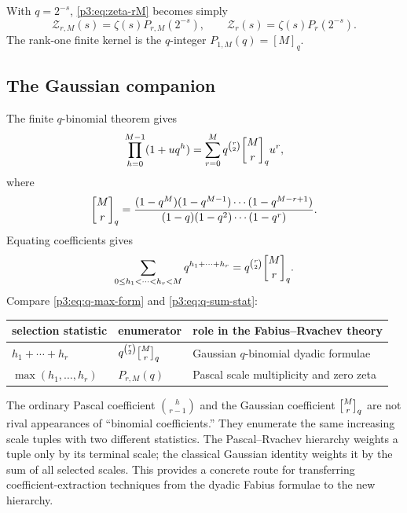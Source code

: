 \documentclass[11pt,oneside]{article}
\theoremstyle{definition}
\theoremstyle{remark}
\begin{document}
With $q=2^{-s}$, \eqref{p3:eq:zeta-rM} becomes simply
\begin{equation}\label{p3:eq:zeta-q-kernel}
  \mathcal Z_{r,M}(s)=\zeta(s)P_{r,M}(2^{-s}),
  \qquad
  \mathcal Z_r(s)=\zeta(s)P_r(2^{-s}).
\end{equation}
The rank-one finite kernel is the $q$-integer $P_{1,M}(q)=[M]_q$.

\subsection{The Gaussian companion}

The finite $q$-binomial theorem gives
\begin{equation}\label{p3:eq:q-binomial-theorem}
 \prod_{h=0}^{M-1}(1+u q^h)
 =\sum_{r=0}^{M}q^{\binom r2}\qbinomPartl{M}{r} u^r,
\end{equation}
where
\[
 \qbinomPartl{M}{r}
 =\frac{(1-q^M)(1-q^{M-1})\cdots(1-q^{M-r+1})}
 {(1-q)(1-q^2)\cdots(1-q^r)}.
\]
Equating coefficients gives
\begin{equation}\label{p3:eq:q-sum-stat}
 \sum_{0\le h_1<\cdots<h_r<M}q^{h_1+\cdots+h_r}
 =q^{\binom r2}\qbinomPartl{M}{r}.
\end{equation}
Compare \eqref{p3:eq:q-max-form} and \eqref{p3:eq:q-sum-stat}:
\begin{center}
\begin{tabular}{@{}lll@{}}
\toprule
selection statistic & enumerator & role in the Fabius--Rvachev theory\\
\midrule
$h_1+\cdots+h_r$ & $q^{\binom r2}\qbinomPartl{M}{r}$ & Gaussian $q$-binomial dyadic formulae\\
$\max(h_1,\ldots,h_r)$ & $P_{r,M}(q)$ & Pascal scale multiplicity and zero zeta\\
\bottomrule
\end{tabular}
\end{center}

\begin{resultbox}
The ordinary Pascal coefficient $\binom h{r-1}$ and the Gaussian coefficient $\qbinomPartl{M}{r}$ are not rival appearances of ``binomial coefficients.''  They enumerate the same increasing scale tuples with two different statistics.  The Pascal--Rvachev hierarchy weights a tuple only by its terminal scale; the classical Gaussian identity weights it by the sum of all selected scales.  This provides a concrete route for transferring coefficient-extraction techniques from the dyadic Fabius formulae to the new hierarchy.
\end{resultbox}
\end{document}
